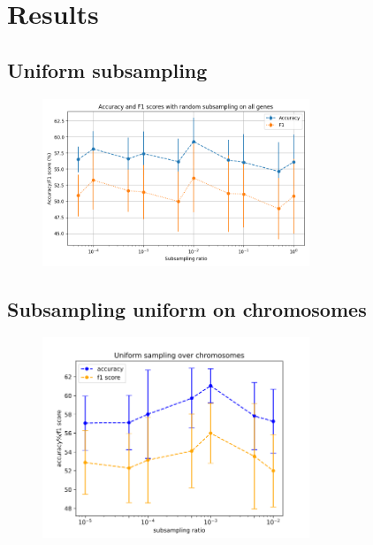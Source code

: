 \section{Results}
\label{sec:results}

\subsection{Uniform subsampling}

\begin{figure}[h]
\includegraphics[width=8cm]{figures/subsample_plot.png}
\end{figure}


\subsection{Subsampling uniform on chromosomes}
\begin{figure}[h]
\includegraphics[width=8cm]{figures/uniform_sample_low_ratio.png}
% 
\end{figure}


